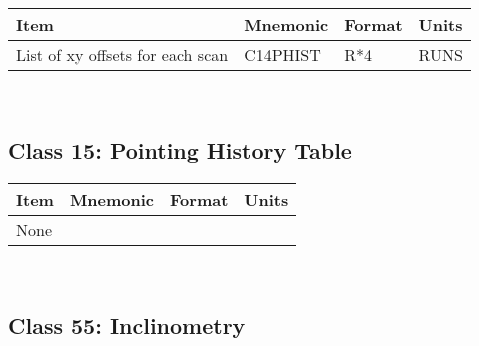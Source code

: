\begin{tabular}{||l|l|l|l||} \hline
Item                             & Mnemonic & Format & Units \\ \hline
List of xy offsets for each scan & C14PHIST & R*4    & RUNS  \\  \hline
\end{tabular}
 \\




\subsection{Class 15: Pointing History Table}

\begin{tabular}{||l|l|l|l||} \hline
Item                      & Mnemonic & Format & Units \\ \hline
 None                     &    ~     &   ~    &   ~   \\ \hline
\end{tabular}
 \\


                                                                                


\subsection{Class 55: Inclinometry}


